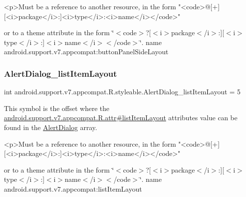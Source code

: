 \begin{DoxyVerb}      <p>Must be a reference to another resource, in the form "<code>@[+][<i>package</i>:]<i>type</i>:<i>name</i></code>"
\end{DoxyVerb}
 or to a theme attribute in the form \char`\"{}$<$code$>$?\mbox{[}$<$i$>$package$<$/i$>$\+:\mbox{]}\mbox{[}$<$i$>$type$<$/i$>$\+:\mbox{]}$<$i$>$name$<$/i$>$$<$/code$>$\char`\"{}.  name android.\+support.\+v7.\+appcompat\+:button\+Panel\+Side\+Layout \mbox{\label{classandroid_1_1support_1_1v7_1_1appcompat_1_1R_1_1styleable_a820f56d87f31d7e978af0b5226344187}} 
\subsubsection{\texorpdfstring{Alert\+Dialog\+\_\+list\+Item\+Layout}{AlertDialog\_listItemLayout}}
{\footnotesize\ttfamily int android.\+support.\+v7.\+appcompat.\+R.\+styleable.\+Alert\+Dialog\+\_\+list\+Item\+Layout = 5\hspace{0.3cm}{\ttfamily [static]}}

This symbol is the offset where the \hyperlink{classandroid_1_1support_1_1v7_1_1appcompat_1_1R_1_1attr_aac806ba62d695aec18eee470353341ac}{android.\+support.\+v7.\+appcompat.\+R.\+attr\#list\+Item\+Layout} attribute\textquotesingle{}s value can be found in the \hyperlink{classandroid_1_1support_1_1v7_1_1appcompat_1_1R_1_1styleable_a52dcd4f818920ef336f5b8033a2b34c1}{Alert\+Dialog} array.

\begin{DoxyVerb}      <p>Must be a reference to another resource, in the form "<code>@[+][<i>package</i>:]<i>type</i>:<i>name</i></code>"
\end{DoxyVerb}
 or to a theme attribute in the form \char`\"{}$<$code$>$?\mbox{[}$<$i$>$package$<$/i$>$\+:\mbox{]}\mbox{[}$<$i$>$type$<$/i$>$\+:\mbox{]}$<$i$>$name$<$/i$>$$<$/code$>$\char`\"{}.  name android.\+support.\+v7.\+appcompat\+:list\+Item\+Layout \mbox{\label{classandroid_1_1support_1_1v7_1_1appcompat_1_1R_1_1styleable_aa5c481cf70cb3310020d7176925aa99c}} 
